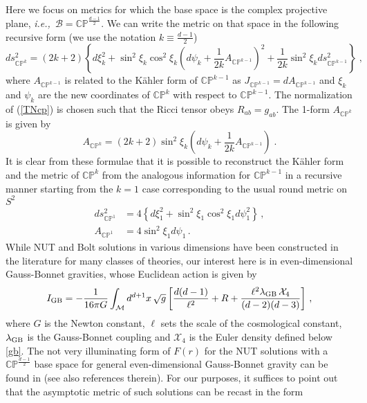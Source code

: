 \documentclass[12pt]{article}
\numberwithin{equation}{section}
\newcommand{\req}[1]{(\ref{#1})} %
\newcommand{\ie}{{\it i.e.,}\ }
\begin{document}
Here we focus on metrics for which the base space is the complex projective plane, \ie $\mathcal{B}=\mathbb{CP}^{\frac{d-1}{2}}$. We can write the metric on that space in the following recursive form (we use the notation $k\equiv \frac{d-1}{2}$)
%
\begin{equation}\label{TNcp}
ds^2_{\mathbb{CP}^{k}} = (2k+2)\left\{d\xi^2_k+\sin^2\xi_k \cos^2\xi_k \left(d\psi_k+\frac{1}{2k}A_{\mathbb{CP}^{k-1}}\right)^2+\frac{1}{2k}\sin^2\xi_k ds^2_{\mathbb{CP}^{k-1}} \right\}\;,
\end{equation}
%
where $A_{\mathbb{CP}^{k-1}}$ is related to the K\"ahler form of $\mathbb{CP}^{k-1}$ as $J_{\mathbb{CP}^{k-1}}=dA_{\mathbb{CP}^{k-1}}$ and $\xi_k$ and $\psi_k$ are the new coordinates of $\mathbb{CP}^{k}$ with respect to $\mathbb{CP}^{k-1}$. The normalization of \req{TNcp} is chosen such that the Ricci tensor obeys $R_{ab}=g_{ab}$. The 1-form  $A_{\mathbb{CP}^{k}}$ is given by
%
\begin{equation}\label{acp}
A_{\mathbb{CP}^{k}} = (2k+2)\sin^2\xi_k\left(d\psi_k+\frac{1}{2k}A_{\mathbb{CP}^{k-1}}\right)\;.
\end{equation}
%
It is clear from these formulae that it is possible to reconstruct the K\"ahler form and the metric of $\mathbb{CP}^{k}$ from the analogous information for $\mathbb{CP}^{k-1}$ in a recursive manner starting from the $k=1$ case corresponding to the usual round metric on $S^2$
%
\begin{equation}\label{cp11}
\begin{split}
ds^2_{\mathbb{CP}^{1}} &= 4\left\{d\xi^2_1+\sin^2\xi_1 \cos^2\xi_1 d\psi_1^2\right\}\,,\\ 
A_{\mathbb{CP}^{1}} &= 4\sin^2\xi_1 d\psi_1\,.
\end{split}
\end{equation}
%
While NUT and Bolt solutions in various dimensions have been constructed in the literature for many classes of theories, our interest here is in even-dimensional Gauss-Bonnet gravities, whose Euclidean action is given by 
%
\begin{equation}\label{gbd}
I_{\rm GB}= -\frac{1}{16\pi G}\int_{\mathcal{M}} d^{d+1}x\, \sqrt{g} \left[\frac{d(d-1)}{\ell^2}+R+\frac{\ell^2 \lambda_{\rm GB}\,\mathcal{X}_4}{(d-2)(d-3)} \right]\, ,
\end{equation}
%
where $G$ is the Newton constant, $\ell$ sets the scale of the cosmological constant, $\lambda_{\rm GB}$ is the Gauss-Bonnet coupling and $\mathcal{X}_4$ is the Euler density defined below \eqref{gb}. The not very illuminating form of $F(r)$ for the NUT solutions with a $\mathbb{CP}^{\frac{d-1}{2}}$ base space for general even-dimensional Gauss-Bonnet gravity can be found in \cite{Dehghani:2005zm} (see also references therein). For our purposes, it suffices to point out that the asymptotic metric of such solutions can be recast in the form
\end{document}
